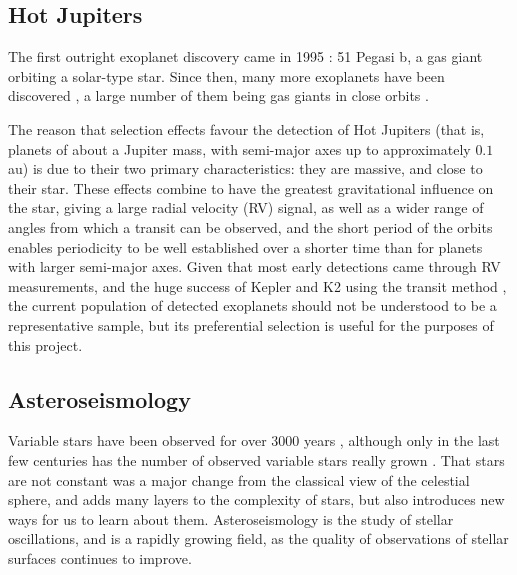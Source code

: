 \documentclass[11pt]{amsart}
\begin{document}
\subsection{Hot Jupiters} \label{Intro:HotJupiters}

The first outright exoplanet discovery came in 1995 \cite{Mayor1995}: 51 Pegasi b, a gas giant orbiting a solar-type star.  Since then, many more exoplanets have been discovered \cite{NASAExoplanet}, a large number of them being gas giants in close orbits \cite{Winn2014}.

The reason that selection effects favour the detection of Hot Jupiters (that is, planets of about a Jupiter mass, with semi-major axes up to approximately $0.1$ au) is due to their two primary characteristics: they are massive, and close to their star.  These effects combine to have the greatest gravitational influence on the star, giving a large radial velocity (RV) signal, as well as a wider range of angles from which a transit can be observed, and the short period of the orbits enables periodicity to be well established over a shorter time than for planets with larger semi-major axes.  Given that most early detections came through RV measurements, and the huge success of Kepler and K2 using the transit method \cite{Coughlin2016}, the current population of detected exoplanets should not be understood to be a representative sample, but its preferential selection is useful for the purposes of this project.




\subsection{Asteroseismology} \label{Intro:Asteroseismology}

Variable stars have been observed for over $3000$ years \cite{Jetsu2015}, although only in the last few centuries has the number of observed variable stars really grown \cite{Hoffleit1997}.  That stars are not constant was a major change from the classical view of the celestial sphere, and adds many layers to the complexity of stars, but also introduces new ways for us to learn about them.  Asteroseismology is the study of stellar oscillations, and is a rapidly growing field, as the quality of observations of stellar surfaces continues to improve.
\end{document}
